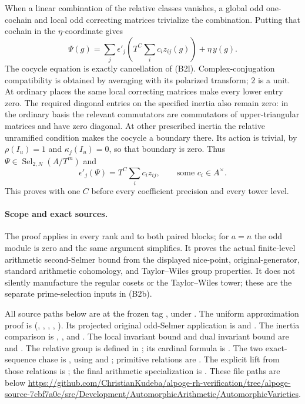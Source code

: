 When a linear combination of the relative classes vanishes,
a global odd one-cochain and local odd correcting matrices
trivialize the combination.
Putting that cochain in the \(\eta\)-coordinate gives
\[
 \Psi(g)=
    \sum_j\epsilon'_j\!\left(T^C\sum_i c_i z_{ij}(g)\right)
                           +\eta\,y(g).
\]
The cocycle equation is exactly cancellation of (B2l).
Complex-conjugation compatibility is obtained by averaging with
its polarized transform; \(2\) is a unit.
At ordinary places the same local correcting matrices make every
lower entry zero.  The required diagonal entries on the specified
inertia also remain zero: in the ordinary basis the relevant
commutators are commutators of upper-triangular matrices and have
zero diagonal.
At other prescribed inertia the relative unramified condition
makes the cocycle a boundary there.  Its action is trivial, by
\(\rho(I_u)=1\) and \(\kappa_j(I_u)=0\), so that boundary is zero.
Thus \(\Psi\in\operatorname{Sel}_{2,N}(A/T^m)\) and
\[
       \epsilon'_j(\Psi)=T^C\sum_i c_i z_{ij},\qquad
                    \text{some }c_i\in A^\times .
\]
This proves  with one \(C\) before every
coefficient precision and every tower level.

\paragraph{Scope and exact sources.}
The proof applies in every rank and to both paired blocks; for
\(a=n\) the odd module is zero and the same argument simplifies.
It proves the actual finite-level arithmetic second-Selmer bound
from the displayed nice-point, original-generator, standard
arithmetic cohomology, and Taylor--Wiles group properties.
It does not silently manufacture the regular cosets or the
Taylor--Wiles tower; these are the separate prime-selection
inputs in (B2b).

All source paths below are at the frozen tag
, under
.
The uniform approximation proof is
(, , ,
, ).
Its projected original odd-Selmer application is
 and .
The inertia comparison is
,
, and .
The local invariant bound and dual invariant bound are
 and .
The relative group is defined in
;
its cardinal formula is .
The two exact-sequence chase is
, using
 and ; primitive relations are
.
The explicit lift from those relations is
; the final arithmetic specialization is
.
These file paths are below
\url{https://github.com/ChristianKudeba/alpoge-rh-verification/tree/alpoge-source-7cbf7a0c/src/Development/AutomorphicArithmetic/AutomorphicVarieties}.

